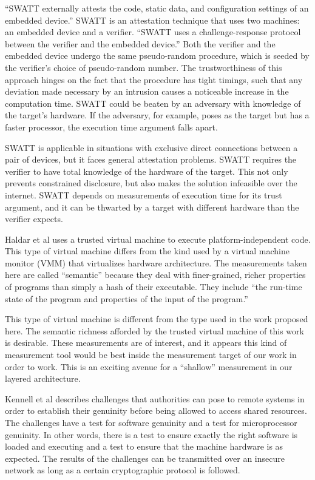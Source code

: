 \documentclass[a4paper,twoside]{article}
\begin{document}
``SWATT externally attests the code, static data, and configuration settings of an embedded device.'' \cite{Swatt} SWATT is an attestation technique that uses two machines: an embedded device and a verifier. ``SWATT uses a challenge-response protocol between the verifier and the embedded device.'' Both the verifier and the embedded device undergo the same pseudo-random procedure, which is seeded by the verifier's choice of pseudo-random number. The trustworthiness of this approach hinges on the fact that the procedure has tight timings, such that any deviation made necessary by an intrusion causes a noticeable increase in the computation time.
 SWATT could be beaten by an adversary with knowledge of the target's hardware. If the adversary, for example, poses as the target but has a faster processor, the execution time argument falls apart.

SWATT is applicable in situations with exclusive direct connections between a pair of devices, but it faces general attestation problems. SWATT requires the verifier to have total knowledge of the hardware of the target. This not only prevents constrained disclosure, but also makes the solution infeasible over the internet. SWATT depends on measurements of execution time for its trust argument, and it can be thwarted by a target with different hardware than the verifier expects.

Haldar et al \cite{SemRemAttest} uses a trusted virtual machine to execute platform-independent code. This type of virtual machine differs from the kind used by a virtual machine monitor (VMM) that virtualizes hardware architecture. The measurements taken here are called ``semantic'' because they deal with finer-grained, richer properties of programs than simply a hash of their executable. They include ``the run-time state of the program and properties of the input of the program.''

This type of virtual machine is different from the type used in the work proposed here. The semantic richness afforded by the trusted virtual machine of this work is desirable. These measurements are of interest, and it appears this kind of measurement tool would be best inside the measurement target of our work in order to work. This is an exciting avenue for a ``shallow'' measurement in our layered architecture.

Kennell et al \cite{Genuinity} describes challenges that authorities can pose to remote systems in order to establish their genuinity before being allowed to access shared resources. The challenges have a test for software genuinity and a test for microprocessor genuinity. In other words, there is a test to ensure exactly the right software is loaded and executing and a test to ensure that the machine hardware is as expected. The results of the challenges can be transmitted over an insecure network as long as a certain cryptographic protocol is followed.
\end{document}
